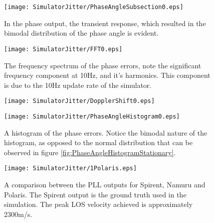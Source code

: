 \begin{figure}[!htb] 
    \centering
    \texttt{[image: SimulatorJitter/PhaseAngleSubsection0.eps]} 
    \caption{In the phase output, the transient response, which resulted in the bimodal distribution of the phase angle is evident.}
    \label{fig:PhaseAngleSubsection0}
\end{figure}

\begin{figure}[!htb] 
    \centering
    \texttt{[image: SimulatorJitter/FFT0.eps]} 
    \caption{The frequency spectrum of the phase errors, note the significant frequency component at 10Hz, and it's harmonics. This component is due to the 10Hz update rate of the simulator.}
    \label{fig:FFT0}
\end{figure}


\begin{figure}[!htb] 
    \centering
    \texttt{[image: SimulatorJitter/DopplerShift0.eps]} 
    \caption{}
    \label{fig:DopplerShift0}
\end{figure}


\begin{figure}[!htb] 
    \centering
    \texttt{[image: SimulatorJitter/PhaseAngleHistogram0.eps]} 
    \caption{A histogram of the phase errors. Notice the bimodal nature of the histogram, as opposed to the normal distribution that can be observed in figure \ref{fig:PhaseAngleHistogramStationary}.}
    \label{fig:PhaseAngleHistogram0}
\end{figure}

\begin{figure}[!htb] 
    \centering
    \texttt{[image: SimulatorJitter/1Polaris.eps]} 
    \caption{A comparison between the PLL outputs for Spirent, Namuru and Polaris. The Spirent output is the ground truth used in the simulation. The peak \ac{LOS} velocity achieved is approximately 2300m/s.}
    \label{fig:1Polaris}
\end{figure}



